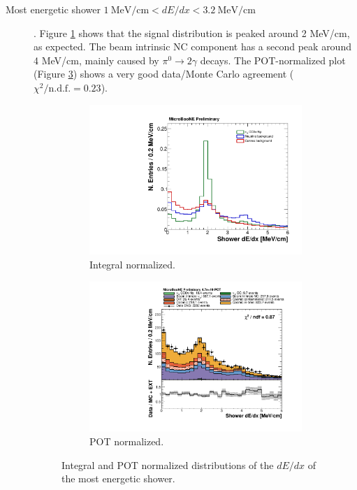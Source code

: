 \begin{description}
\item[Most energetic shower $1~\mathrm{MeV/cm} < dE/dx <3.2~\mathrm{MeV/cm}$]. Figure \ref{fig:dedx_integral} shows that the signal distribution is peaked around 2 MeV/cm, as expected. The beam intrinsic NC component has a second peak around 4 MeV/cm, mainly caused by $\pi^0\rightarrow2\gamma$ decays. The POT-normalized plot (Figure \ref{fig:dedx_pot}) shows a very good data/Monte Carlo agreement ($\chi^2 / \mathrm{n.d.f.} = 0.23$).

\begin{figure}[htbp]
\centering
  \begin{subfigure}{0.45\textwidth}
    \includegraphics[width=\linewidth]{figures/h_dedx_norm.pdf}
    \caption{Integral normalized.} \label{fig:dedx_integral}
  \end{subfigure}
    \begin{subfigure}{0.45\textwidth}
    \includegraphics[width=\linewidth]{figures/h_dedx.pdf}
    \caption{POT normalized.} \label{fig:dedx_pot}
  \end{subfigure}
  \caption{Integral and POT normalized distributions of the $dE/dx$ of the most energetic shower.}
\end{figure}


\end{description}
